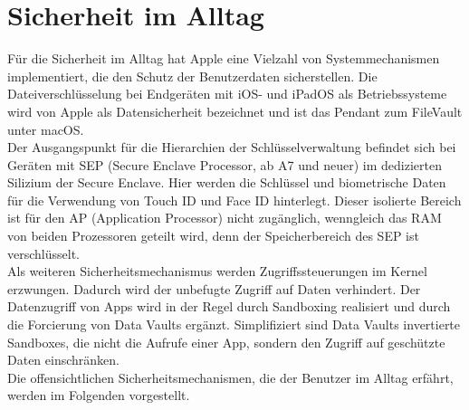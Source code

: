 \section{Sicherheit im Alltag}
Für die Sicherheit im Alltag hat Apple eine Vielzahl von Systemmechanismen implementiert, 
die den Schutz der Benutzerdaten sicherstellen. Die Dateiverschlüsselung bei Endgeräten mit iOS- und 
iPadOS als Betriebssysteme wird von Apple als Datensicherheit bezeichnet und ist das Pendant zum 
FileVault unter macOS. \cite{apple2020} \\

Der Ausgangspunkt für die Hierarchien der Schlüsselverwaltung befindet sich bei Geräten 
mit SEP (Secure Enclave Processor, ab A7 und neuer) im dedizierten Silizium der Secure Enclave. 
Hier werden die Schlüssel und biometrische Daten für die Verwendung von Touch ID und Face ID 
hinterlegt. Dieser isolierte Bereich ist für den AP (Application Processor) nicht zugänglich, wenngleich 
das RAM von beiden Prozessoren geteilt wird, denn der Speicherbereich des SEP ist verschlüsselt. \cite{apple2020} \\

Als weiteren Sicherheitsmechanismus werden Zugriffssteuerungen im Kernel erzwungen. Dadurch wird der unbefugte 
Zugriff auf Daten verhindert. Der Datenzugriff von Apps wird in der Regel durch Sandboxing realisiert und durch die 
Forcierung von Data Vaults ergänzt. Simplifiziert sind Data Vaults invertierte Sandboxes, die nicht die Aufrufe einer App, 
sondern den Zugriff auf geschützte Daten einschränken. \cite{apple2020} \\

Die offensichtlichen Sicherheitsmechanismen, die der Benutzer im Alltag erfährt, werden im Folgenden vorgestellt.

